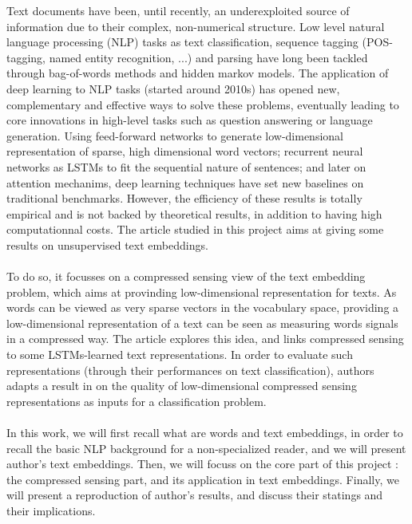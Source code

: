 \documentclass{article}
\begin{document}
Text documents have been, until recently, an underexploited
source of information due to their complex, non-numerical
structure. Low level natural language processing (NLP)
tasks as text classification, 
sequence tagging (POS-tagging, named entity recognition, ...) and 
parsing have long been tackled through bag-of-words methods 
and hidden markov models. The application of deep learning 
to NLP tasks (started around 2010s) has opened new, complementary 
and effective ways to solve these problems, eventually leading to core
innovations in high-level tasks such as question answering or 
language generation. Using feed-forward networks 
to generate low-dimensional representation of sparse, high 
dimensional word vectors; recurrent neural networks as LSTMs
to fit the sequential nature of sentences; and later on attention mechanims,
deep learning techniques have set new baselines on traditional benchmarks. 
However, the efficiency of these results is totally empirical 
and is not backed by theoretical results, in addition to having 
high computationnal costs. The article studied in this project \cite{arora2018sensing}
aims at giving some results on unsupervised text embeddings. 
\\ \\
To do so, it focusses on a compressed sensing view of the text 
embedding problem, which aims at provinding low-dimensional representation
for texts. As words can be viewed 
as very sparse vectors in the vocabulary space, providing a 
low-dimensional representation of a text can be seen as measuring 
words signals in a compressed way. The article explores this idea, 
and links compressed sensing to some LSTMs-learned text representations.
In order to evaluate such representations (through their 
performances on text classification), authors
 adapts a result in \cite{Calderbank2009CompressedL} on the quality
of low-dimensional compressed sensing representations as inputs
for a classification problem. \\ \\
In this work, we will first recall what are words and text embeddings, 
in order to recall the basic NLP background for a non-specialized reader,
and we will present author's text embeddings.
Then, we will focuss on the core part of this project : the compressed 
sensing part, and its application in text embeddings. Finally, we 
will present a reproduction of author's results, and discuss their
 statings and their implications.
\end{document}
